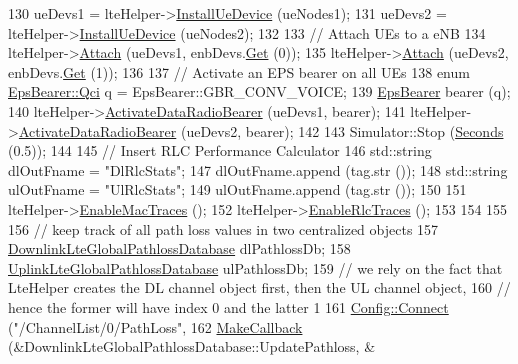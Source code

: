 \begin{DoxyCode}
130   ueDevs1 = lteHelper->\hyperlink{classns3_1_1LteHelper_ac9cd932d7de92811cfa953c2e3b2fc9f}{InstallUeDevice} (ueNodes1);
131   ueDevs2 = lteHelper->\hyperlink{classns3_1_1LteHelper_ac9cd932d7de92811cfa953c2e3b2fc9f}{InstallUeDevice} (ueNodes2);
132 
133   \textcolor{comment}{// Attach UEs to a eNB}
134   lteHelper->\hyperlink{classns3_1_1LteHelper_a9466743f826aa2652a87907b7f0a1c87}{Attach} (ueDevs1, enbDevs.\hyperlink{classns3_1_1NetDeviceContainer_a677d62594b5c9d2dea155cc5045f4d0b}{Get} (0));
135   lteHelper->\hyperlink{classns3_1_1LteHelper_a9466743f826aa2652a87907b7f0a1c87}{Attach} (ueDevs2, enbDevs.\hyperlink{classns3_1_1NetDeviceContainer_a677d62594b5c9d2dea155cc5045f4d0b}{Get} (1));
136 
137   \textcolor{comment}{// Activate an EPS bearer on all UEs}
138   \textcolor{keyword}{enum} \hyperlink{structns3_1_1EpsBearer_aecf0c67109c5eb4ec0b07226fff5885e}{EpsBearer::Qci} q = EpsBearer::GBR\_CONV\_VOICE;
139   \hyperlink{structns3_1_1EpsBearer}{EpsBearer} bearer (q);
140   lteHelper->\hyperlink{classns3_1_1LteHelper_ac896e16cf162e4beeaa292d39ab1b700}{ActivateDataRadioBearer} (ueDevs1, bearer);
141   lteHelper->\hyperlink{classns3_1_1LteHelper_ac896e16cf162e4beeaa292d39ab1b700}{ActivateDataRadioBearer} (ueDevs2, bearer);
142 
143   Simulator::Stop (\hyperlink{group__timecivil_ga33c34b816f8ff6628e33d5c8e9713b9e}{Seconds} (0.5));
144 
145   \textcolor{comment}{// Insert RLC Performance Calculator}
146   std::string dlOutFname = \textcolor{stringliteral}{"DlRlcStats"};
147   dlOutFname.append (tag.str ());
148   std::string ulOutFname = \textcolor{stringliteral}{"UlRlcStats"};
149   ulOutFname.append (tag.str ());
150 
151   lteHelper->\hyperlink{classns3_1_1LteHelper_affa3a12841520407d3662417fe41863d}{EnableMacTraces} ();
152   lteHelper->\hyperlink{classns3_1_1LteHelper_abadfdd04d30b261e9b6f0846b4784928}{EnableRlcTraces} ();
153 
154 
155 
156   \textcolor{comment}{// keep track of all path loss values in two centralized objects}
157   \hyperlink{classns3_1_1DownlinkLteGlobalPathlossDatabase}{DownlinkLteGlobalPathlossDatabase} dlPathlossDb;
158   \hyperlink{classns3_1_1UplinkLteGlobalPathlossDatabase}{UplinkLteGlobalPathlossDatabase} ulPathlossDb;
159   \textcolor{comment}{// we rely on the fact that LteHelper creates the DL channel object first, then the UL channel object,}
160   \textcolor{comment}{// hence the former will have index 0 and the latter 1}
161   \hyperlink{group__config_ga4014f151241cd0939b6cb64409605736}{Config::Connect} (\textcolor{stringliteral}{"/ChannelList/0/PathLoss"},
162                    \hyperlink{group__makecallbackmemptr_ga9376283685aa99d204048d6a4b7610a4}{MakeCallback} (&DownlinkLteGlobalPathlossDatabase::UpdatePathloss, &

\end{DoxyCode}
